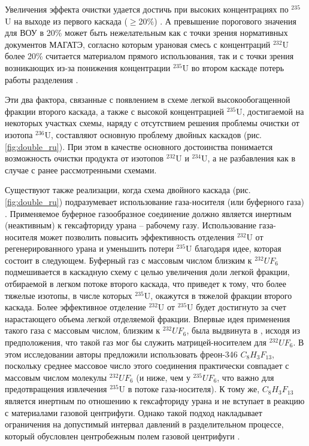Увеличения эффекта очистки удается достичь при высоких концентрациях по $^{235}$U на выходе из первого каскада ($\geq$20\%) \cite{SposobIzotopnogoVosstanovleniyac}. А превышение порогового значения для ВОУ в 20\% может быть нежелательным как с точки зрения нормативных документов МАГАТЭ, согласно которым урановая смесь с концентраций $^{232}$U более 20\% считается материалом прямого использования, так и с точки зрения возникающих из-за понижения концентрации  $^{235}$U во втором каскаде потерь работы разделения \cite{ManagementHighEnriched2005}.

Эти два фактора, связанные с появлением в схеме легкой высокообогащенной фракции второго каскада, а также с высокой концентрацией $^{235}$U, достигаемой на некоторых участках схемы, наряду с отсутствием решения проблемы очистки от изотопа $^{236}$U, составляют основную проблему двойных каскадов (рис. \ref{fig:double_ru}). При этом в качестве основного достоинства понимается возможность очистки продукта от изотопов $^{232}$U и $^{234}$U, а не разбавления как в случае с ранее рассмотренными схемами.

Существуют также реализации, когда схема двойного каскада (рис. \ref{fig:double_ru}) подразумевает использование газа-носителя (или буферного газа) \cite{prusakovCorrectingIsotopicComposition2008, SposobIzotopnogoVosstanovleniyab}. Применяемое буферное газообразное соединение должно является инертным (неактивным) к гексафториду урана -- рабочему газу. Использование газа-носителя может позволить повысить эффективность отделения $^{232}$U от регенерированного урана и уменьшить потери $^{235}$U благодаря идее, которая состоит в следующем. Буферный газ с массовым числом близким к $^{232}UF_6$ подмешивается в каскадную схему с целью увеличения доли легкой фракции, отбираемой в легком потоке второго каскада, что приведет к тому, что более тяжелые изотопы, в числе которых $^{235}$U, окажутся в тяжелой фракции второго каскада. Более эффективное отделение $^{232}$U от $^{235}$U будет достигнуто за счет нарастающего объема легкой отделяемой фракции. Впервые идея применения такого газа с массовым числом, близким к $^{232}UF_6$, была выдвинута в \cite{SosninYuChelcov}, исходя из предположения, что такой газ мог бы служить матрицей-носителем для $^{232}UF_6$.
В этом исследовании авторы предложили использовать фреон-346 $C_{8}H_{3}F_{13}$, поскольку среднее массовое число этого соединения практически совпадает с массовым числом молекулы $^{232}UF_6$ (и ниже, чем у $^{235}UF_6$, что важно для предотвращения извлечения $^{235}$U в потоке газа-носителя). К тому же, $C_{8}H_{3}F_{13}$ является инертным по отношению к гексафториду урана и не вступает в реакцию с материалами газовой центрифуги. Однако такой подход накладывает ограничения на допустимый интервал давлений в разделительном процессе, который обусловлен центробежным полем газовой центрифуги \cite{prusakovCorrectingIsotopicComposition2008}.

